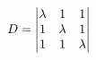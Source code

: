 \documentclass[preview]{standalone}
\begin{document}
\begin{align*}
\special{dvisvgm:raw <g id='unique000'>}D=\begin{vmatrix}\lambda&1&1\\1&\lambda&1\\1&1&\lambda\end{vmatrix}\special{dvisvgm:raw </g>}
\end{align*}
\end{document}
